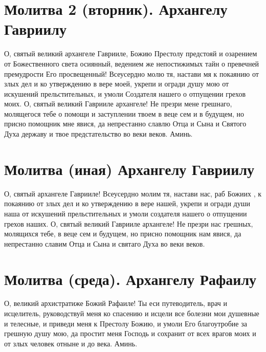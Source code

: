 \section{Молитва 2 (вторник). Архангелу Гавриилу}\begin{mymulticols}



О, святый великий архангеле Гаврииле, Божию Престолу предстояй и озарением от Божественного света осиянный, ведением же непостижимых тайн о превечней премудрости Его просвещенный! Всеусердно молю тя, настави мя к покаянию от злых дел и ко утверждению в вере моей, укрепи и огради душу мою от искушений прельстительных, и умоли Создателя нашего о отпущении грехов моих. О, святый великий Гаврииле архангеле! Не презри мене грешнаго, молящегося тебе о помощи и заступлении твоем в веце сем и в будущем, но присно помощник мне явися, да непрестанно славлю Отца и Сына и Святого Духа державу и твое предстательство во веки веков. Аминь.


\end{mymulticols}

\section{Молитва (иная) Архангелу Гавриилу}\begin{mymulticols}



О, святый архангеле Гаврииле! Всеусердно молим тя, настави нас, раб Божиих , к покаянию от злых дел и ко утверждению в вере нашей, укрепи и огради души наша от искушений прельстительных и умоли создателя нашего о отпущении грехов наших. О, святый великий Гаврииле архангеле! Не презри нас грешных, молящихся тебе, в веце сем и будущем, но присно помощник нам явися, да непрестанно славим Отца и Сына и святаго Духа во веки веков.

\end{mymulticols}

\mychapterending





\section{Молитва (среда). Архангелу Рафаилу}\begin{mymulticols}



О, великий архистратиже Божий Рафаиле! Ты еси путеводитель, врач и исцелитель, руководствуй меня ко спасению и исцели все болезни мои душевные и телесные, и приведи меня к Престолу Божию, и умоли Его благоутробие за грешную душу мою, да простит меня Господь и сохранит от всех врагов моих и от злых человек отныне и до века. Аминь.

\end{mymulticols}


